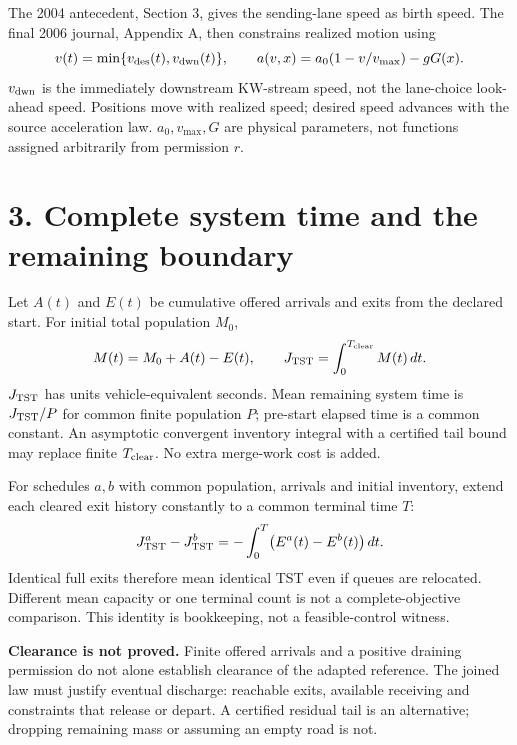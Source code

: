\documentclass[11pt,a4paper]{article}
\begin{document}
The 2004 antecedent, Section 3, gives the sending-lane speed as birth speed.
The final 2006 journal, Appendix A, then constrains realized motion using
\begin{equation}
v(t)=\min\{v_{\rm des}(t),v_{\rm dwn}(t)\},\qquad
a(v,x)=a_0(1-v/v_{\max})-gG(x).
\end{equation}
$v_{\rm dwn}$ is the immediately downstream KW-stream speed, not the lane-choice
look-ahead speed. Positions move with realized speed; desired speed advances
with the source acceleration law. $a_0,v_{\max},G$ are physical parameters, not
functions assigned arbitrarily from permission $r$.

\newpage
\section*{3. Complete system time and the remaining boundary}
Let $A(t)$ and $E(t)$ be cumulative offered arrivals and exits from the declared
start. For initial total population $M_0$,
\begin{equation}
M(t)=M_0+A(t)-E(t),\qquad
J_{\rm TST}=\int_0^{T_{\rm clear}}M(t)\,dt.
\end{equation}
$J_{\rm TST}$ has units vehicle-equivalent seconds. Mean remaining system time
is $J_{\rm TST}/P$ for common finite population $P$; pre-start elapsed time is
a common constant. An asymptotic convergent inventory integral with a certified
tail bound may replace finite $T_{\rm clear}$. No extra merge-work cost is added.

For schedules $a,b$ with common population, arrivals and initial inventory,
extend each cleared exit history constantly to a common terminal time $T$:
\begin{equation}
J_{\rm TST}^{a}-J_{\rm TST}^{b}
=-\int_0^T\bigl(E^a(t)-E^b(t)\bigr)\,dt.
\end{equation}
Identical full exits therefore mean identical TST even if queues are relocated.
Different mean capacity or one terminal count is not a complete-objective
comparison. This identity is bookkeeping, not a feasible-control witness.

\textbf{Clearance is not proved.} Finite offered arrivals and a positive draining
permission do not alone establish clearance of the adapted reference. The joined
law must justify eventual discharge: reachable exits, available receiving and
constraints that release or depart. A certified residual tail is an alternative;
dropping remaining mass or assuming an empty road is not.
\end{document}
